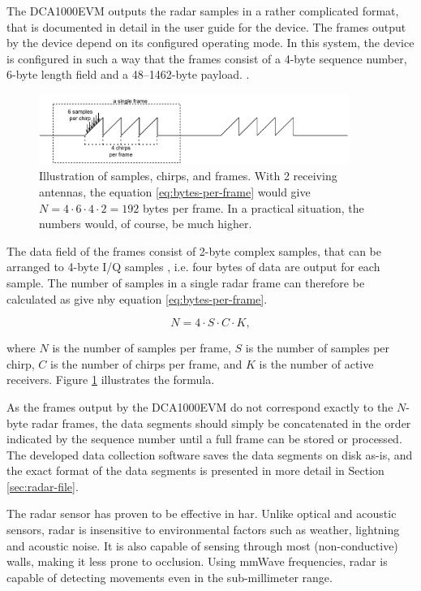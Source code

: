 The DCA1000EVM outputs the radar samples in a rather complicated format,
that is documented in detail in the user guide for the device.
The frames output by the device depend on its configured operating mode.
In this system, the device is configured in such a way that the frames consist of a 4-byte sequence number,
6-byte length field and a 48--1462-byte payload. \cite{dca1000-user-guide}.

\begin{figure}[H]
    \centering
    \includegraphics[width=0.9\textwidth]{fig/2/2-radar-sampling.pdf}
    \caption{Illustration of samples, chirps, and frames. With 2 receiving antennas,
    the equation \ref{eq:bytes-per-frame} would give $N = 4\cdot6\cdot4\cdot2 = 192$ bytes per frame.
    In a practical situation, the numbers would, of course, be much higher.}
    \label{fig:2-radar-signal-sampling}
\end{figure}

The data field of the frames consist of 2-byte complex samples,
that can be arranged to 4-byte I/Q samples \cite{dca1000-raw-data-capture},
i.e. four bytes of data are output for each sample.
The number of samples in a single radar frame can therefore be calculated as give nby equation \ref{eq:bytes-per-frame}.

\begin{equation}
\label{eq:bytes-per-frame}
    N = 4 \cdot S \cdot C \cdot K,
\end{equation}

where $N$ is the number of samples per frame,
$S$ is the number of samples per chirp,
$C$ is the number of chirps per frame,
and $K$ is the number of active receivers.
Figure \ref{fig:2-radar-signal-sampling} illustrates the formula.

As the frames output by the DCA1000EVM do not correspond exactly to the $N$-byte radar frames,
the data segments should simply be concatenated in the order indicated by the sequence number until a full frame can be stored or processed.
The developed data collection software saves the data segments on disk as-is,
and the exact format of the data segments is presented in more detail in Section \ref{sec:radar-file}.

The radar sensor has proven to be effective in \gls{har}.
Unlike optical and acoustic sensors,
radar is insensitive to environmental factors such as weather, lightning and acoustic noise.
It is also capable of sensing through most (non-conductive) walls,
making it less prone to occlusion.
Using \gls{mmWave} frequencies, radar is capable of detecting movements even in the sub-millimeter range.

